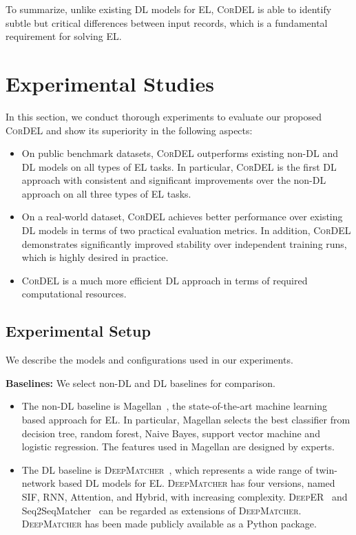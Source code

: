 \documentclass[conference]{IEEEtran}
\begin{document}
To summarize, unlike existing DL models for EL, \textsc{CorDEL} is able to identify subtle but critical differences between input records, which is a fundamental requirement for solving EL.

\section{Experimental Studies}\label{sec:experiments}

In this section, we conduct thorough experiments to evaluate our proposed \textsc{CorDEL} and show its superiority in the following aspects:
\begin{itemize}
    \item On public benchmark datasets, \textsc{CorDEL} outperforms existing non-DL and DL models on all types of EL tasks. In particular, \textsc{CorDEL} is the first DL approach with consistent and significant improvements over the non-DL approach on all three types of EL tasks.
    
    \item On a real-world dataset, \textsc{CorDEL} achieves better performance over existing DL models in terms of two practical evaluation metrics. In addition, \textsc{CorDEL} demonstrates significantly improved stability over independent training runs, which is highly desired in practice.
    
    \item \textsc{CorDEL} is a much more efficient DL approach in terms of required computational resources.
\end{itemize}

\subsection{Experimental Setup}

We describe the models and configurations used in our experiments.

\textbf{Baselines:} We select non-DL and DL baselines for comparison.
\begin{itemize}
    \item The non-DL baseline is Magellan~\cite{konda2016magellan}, the state-of-the-art machine learning based approach for EL. In particular, Magellan selects the best classifier from decision tree, random forest, Naive Bayes, support vector machine and logistic regression. The features used in Magellan are designed by experts.
    
    \item The DL baseline is \textsc{DeepMatcher}~\cite{mudgal2018deep}, which represents a wide range of twin-network based DL models for EL. \textsc{DeepMatcher} has four versions, named SIF, RNN, Attention, and Hybrid, with increasing complexity. \textsc{DeepER}~\cite{ebraheem2018distributed} and Seq2SeqMatcher~\cite{nie2019deep} can be regarded as extensions of \textsc{DeepMatcher}. \textsc{DeepMatcher} has been made publicly available as a Python package.
\end{itemize}
\end{document}

